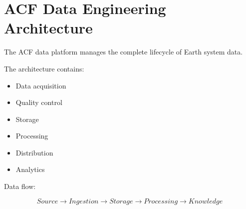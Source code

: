 \section{ACF Data Engineering Architecture}


The ACF data platform manages the complete lifecycle of
Earth system data.



The architecture contains:


\begin{itemize}

\item Data acquisition

\item Quality control

\item Storage

\item Processing

\item Distribution

\item Analytics

\end{itemize}



Data flow:


\[
Source
\rightarrow
Ingestion
\rightarrow
Storage
\rightarrow
Processing
\rightarrow
Knowledge
\]
